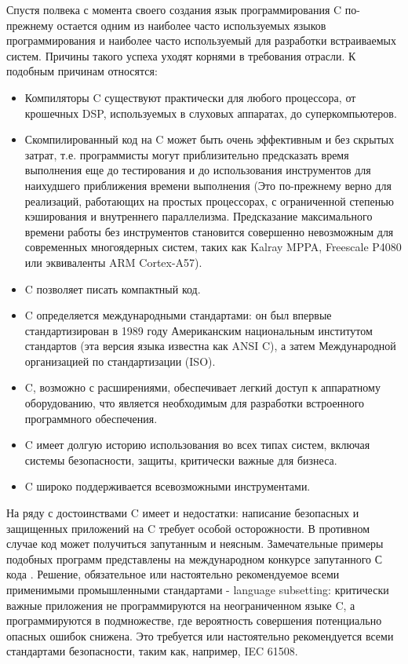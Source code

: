 Спустя полвека с момента своего создания язык программирования C по-прежнему остается одним из наиболее часто 
используемых языков программирования\cite{TiobeIndex} и наиболее часто используемый для разработки 
встраиваемых систем. Причины такого успеха уходят корнями в требования отрасли. К подобным причинам относятся\cite{bagnara2018misra}:
\begin{itemize}
    \item Компиляторы C существуют практически для любого процессора, от крошечных DSP, используемых в слуховых аппаратах, до суперкомпьютеров.
    \item Скомпилированный код на C может быть очень эффективным и без скрытых затрат, т.е. программисты могут приблизительно предсказать время 
        выполнения еще до тестирования и до использования инструментов для наихудшего приближения времени выполнения (Это по-прежнему верно для 
        реализаций, работающих на простых процессорах, с ограниченной степенью кэширования и внутреннего параллелизма. Предсказание максимального 
        времени работы без инструментов становится совершенно невозможным для современных многоядерных систем, таких как Kalray MPPA, Freescale P4080 
        или эквиваленты ARM Cortex-A57).
    \item C позволяет писать компактный код.
    \item C определяется международными стандартами: он был впервые стандартизирован в 1989 году Американским национальным институтом стандартов (эта 
        версия языка известна как ANSI C), а затем Международной организацией по стандартизации (ISO).
    \item C, возможно с расширениями, обеспечивает легкий доступ к аппаратному оборудованию, что является необходимым для разработки встроенного 
        программного обеспечения.
    \item C имеет долгую историю использования во всех типах систем, включая системы безопасности, защиты, критически важные для бизнеса.
    \item C широко поддерживается всевозможными инструментами.
\end{itemize}

На ряду с достоинствами C имеет и недостатки: написание безопасных 
и защищенных приложений на C требует особой осторожности. В противном случае код может получиться 
запутанным и неясным. Замечательные примеры подобных программ представлены на международном конкурсе 
запутанного С кода \cite{ioccc}. Решение, обязательное или настоятельно рекомендуемое 
всеми применимыми промышленными стандартами - language subsetting: критически важные приложения не 
программируются на неограниченном языке C, а программируются в подмножестве, где вероятность совершения 
потенциально опасных ошибок снижена. Это требуется или настоятельно рекомендуется всеми стандартами 
безопасности, таким как, например, IEC 61508\cite{IEC61508}.

